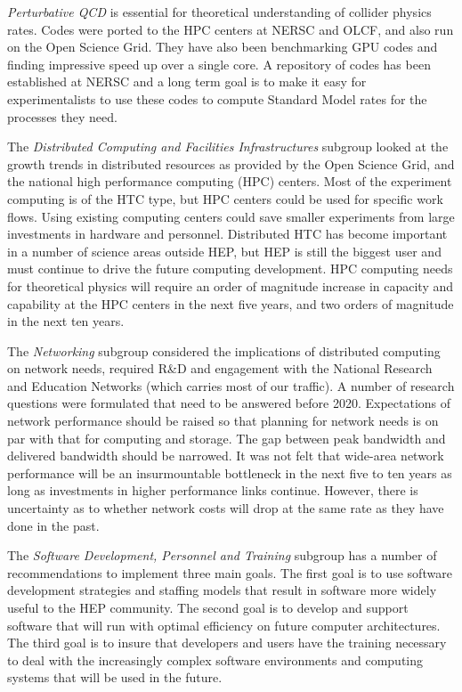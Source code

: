 {\it Perturbative QCD} is essential for theoretical understanding of collider physics rates. Codes were ported to the HPC centers at  NERSC and OLCF, and also run on the Open Science Grid. They have also been benchmarking GPU codes and finding impressive speed up over a single core.  A repository of codes has been established at NERSC and a long term goal is to make it easy for experimentalists to use these codes to compute Standard Model rates for the processes they need.

The {\it Distributed Computing and Facilities Infrastructures} subgroup looked at the growth trends in distributed resources as provided by the Open Science Grid, and the national high performance computing (HPC) centers.  Most of the experiment computing is of the HTC type, but HPC centers could be used for specific work flows.  Using existing computing centers could save smaller experiments from large investments in hardware and personnel.  Distributed HTC has become important in a number of science areas outside HEP, but HEP is still the biggest user and must continue to drive the future computing development.  HPC computing needs for theoretical physics will require an order of magnitude increase in capacity and capability at the HPC centers in the next five years, and two orders of magnitude in the next ten years.

The {\it Networking} subgroup considered the implications of  distributed computing on network needs, required R\&D and engagement with the National Research and Education Networks (which carries most of our traffic). A number of research questions were formulated that need to be answered before 2020. Expectations of network performance should be raised so that planning for network needs is on par with that for computing and storage.  The gap between peak bandwidth and delivered bandwidth should be narrowed.  It was not felt that wide-area network performance will be an insurmountable bottleneck in the next five to ten years as long as investments in higher performance links continue.  However, there is uncertainty as to whether network costs will drop at the same rate as they have done in the past.

The {\it Software Development, Personnel and Training} subgroup has a number of recommendations to implement three main goals.  The first goal is to use software development strategies and staffing models that result in software more widely useful to the HEP community.  The second goal is to develop and support software that will run with optimal efficiency on future computer architectures. The third goal is to insure that developers and users have the training necessary to deal with the increasingly complex software environments and computing systems that will be used in the future.

